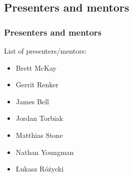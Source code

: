 \subsection{Presenters and mentors}

\begin{frame}[t]
  \frametitle{Presenters and mentors}

  List of presenters/mentors:

  \begin{itemize}
  \item Brett McKay
  \item Gerrit Renker
  \item James Bell
  \item Jordan Torbiak
  \item Matthias Stone
  \item Nathan Youngman
  \item Łukasz Różycki
  \end{itemize}
\end{frame}

